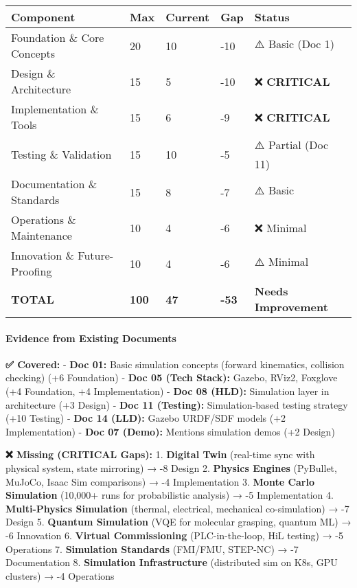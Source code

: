 \documentclass[
]{article}
\begin{document}
\begin{longtable}[]{@{}lllll@{}}
\toprule\noalign{}
Component & Max & Current & Gap & Status \\
\midrule\noalign{}
\endhead
\bottomrule\noalign{}
\endlastfoot
Foundation \& Core Concepts & 20 & 10 & -10 & ⚠️ Basic (Doc 1) \\
Design \& Architecture & 15 & 5 & -10 & ❌ \textbf{CRITICAL} \\
Implementation \& Tools & 15 & 6 & -9 & ❌ \textbf{CRITICAL} \\
Testing \& Validation & 15 & 10 & -5 & ⚠️ Partial (Doc 11) \\
Documentation \& Standards & 15 & 8 & -7 & ⚠️ Basic \\
Operations \& Maintenance & 10 & 4 & -6 & ❌ Minimal \\
Innovation \& Future-Proofing & 10 & 4 & -6 & ⚠️ Minimal \\
\textbf{TOTAL} & \textbf{100} & \textbf{47} & \textbf{-53} &
\textbf{Needs Improvement} \\
\end{longtable}

\hypertarget{evidence-from-existing-documents-4}{%
\paragraph{Evidence from Existing
Documents}\label{evidence-from-existing-documents-4}}

\textbf{✅ Covered:} - \textbf{Doc 01:} Basic simulation concepts
(forward kinematics, collision checking) (+6 Foundation) - \textbf{Doc
05 (Tech Stack):} Gazebo, RViz2, Foxglove (+4 Foundation, +4
Implementation) - \textbf{Doc 08 (HLD):} Simulation layer in
architecture (+3 Design) - \textbf{Doc 11 (Testing):} Simulation-based
testing strategy (+10 Testing) - \textbf{Doc 14 (LLD):} Gazebo URDF/SDF
models (+2 Implementation) - \textbf{Doc 07 (Demo):} Mentions simulation
demos (+2 Design)

\textbf{❌ Missing (CRITICAL Gaps):} 1. \textbf{Digital Twin} (real-time
sync with physical system, state mirroring) → -8 Design 2.
\textbf{Physics Engines} (PyBullet, MuJoCo, Isaac Sim comparisons) → -4
Implementation 3. \textbf{Monte Carlo Simulation} (10,000+ runs for
probabilistic analysis) → -5 Implementation 4. \textbf{Multi-Physics
Simulation} (thermal, electrical, mechanical co-simulation) → -7 Design
5. \textbf{Quantum Simulation} (VQE for molecular grasping, quantum ML)
→ -6 Innovation 6. \textbf{Virtual Commissioning} (PLC-in-the-loop, HiL
testing) → -5 Operations 7. \textbf{Simulation Standards} (FMI/FMU,
STEP-NC) → -7 Documentation 8. \textbf{Simulation Infrastructure}
(distributed sim on K8s, GPU clusters) → -4 Operations
\end{document}
